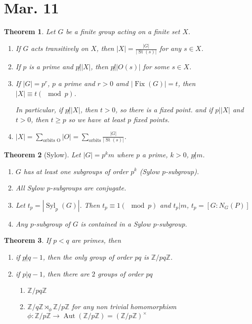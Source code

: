 \documentclass{amsart}
\newtheorem{thm}{Theorem}[section]
\theoremstyle{definition}
\newcommand{\Z}{\mathbb Z}
\DeclareMathOperator{\Aut}{Aut}
\DeclareMathOperator{\St}{St}
\DeclareMathOperator{\Fix}{Fix}
\DeclareMathOperator{\Syl}{Syl}
\begin{document}
\section{Mar. 11}
\begin{thm}
	Let $G$ be a finite group acting on a finite set $X$.
	\begin{enumerate}
		\item If $G$ acts transitively on $X$, then $|X|=\frac{|G|}{|\St(s)|}$ for any $s\in X$.
		\item If $p$ is a prime and $p\not||X|$, then $p\not||O(s)|$ for some $s\in X$.
		\item If $|G|=p^r$, $p$ a prime and $r>0$ amd $|\Fix(G)|=t$, then $|X|\equiv t(\mod p)$.
	
	In particular, if $p\not||X|$, then $t>0$, so there is a fixed point. and if $p||X|$ and $t>0$, then $t\geq p$ so we have at least $p$ fixed points.
		\item $|X|=\sum_{\text{orbits O}}|O|=\sum_{\text{orbits}}\frac{|G|}{|\St(s)|}$.
		\end{enumerate}
\end{thm}
\begin{thm}[Sylow]
	Let $|G|=p^km$ where $p$ a prime, $k>0$, $p\not|m$.
	\begin{enumerate}
		\item $G$ has at least one subgroups of order $p^k$ (Sylow $p$-subgroup).
		\item All Sylow $p$-subgroups are conjugate.
		\item Let $t_p=|\Syl_p(G)|$. Then $t_p\equiv 1(\mod p)$ and $t_p|m$, $t_p=[G:N_G(P)]$
		\item Any $p$-subgroup of $G$ is contained in a Sylow $p$-subgroup.
	\end{enumerate}
\end{thm}
\begin{thm}
	If $p<q$ are primes, then
	\begin{enumerate}
		\item if $p\not|q-1$, then the only group of order $pq$ is $\Z/pq\Z$.
		\item if $p|q-1$, then there are $2$ groups of order $pq$
			\begin{enumerate}
				\item $\Z/pq\Z$
				\item $\Z/q\Z\rtimes_\phi \Z/p\Z$ for any non trivial homomorphism $\phi:\Z/p\Z\to\Aut(\Z/p\Z)=(\Z/p\Z)^\times$
			\end{enumerate} 
	\end{enumerate}
\end{thm}
\end{document}
